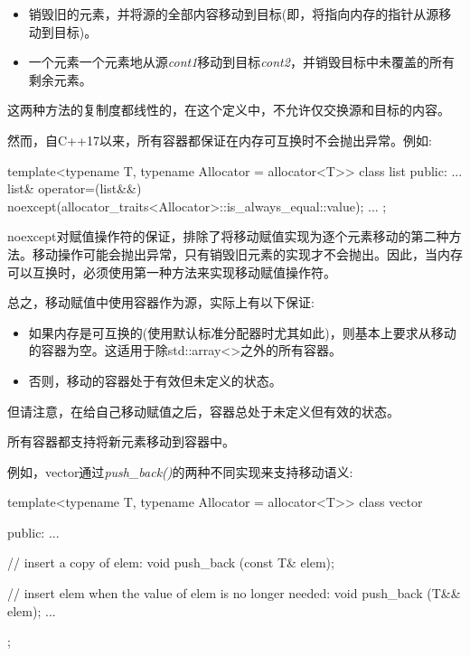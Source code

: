\begin{itemize}
  \item 销毁旧的元素，并将源的全部内容移动到目标(即，将指向内存的指针从源移动到目标)。
  \item 一个元素一个元素地从源\textit{cont1}移动到目标\textit{cont2}，并销毁目标中未覆盖的所有剩余元素。
\end{itemize}

这两种方法的复制度都线性的，在这个定义中，不允许仅交换源和目标的内容。\par

然而，自C++17以来，所有容器都保证在内存可互换时不会抛出异常。例如:\par

\begin{codebox}[cpp]
template<typename T, typename Allocator = allocator<T>>
class list {
public:
  ...
  list& operator=(list&&)
  noexcept(allocator_traits<Allocator>::is_always_equal::value);
  ...
};
\end{codebox}

noexcept对赋值操作符的保证，排除了将移动赋值实现为逐个元素移动的第二种方法。移动操作可能会抛出异常，只有销毁旧元素的实现才不会抛出。因此，当内存可以互换时，必须使用第一种方法来实现移动赋值操作符。\par

总之，移动赋值中使用容器作为源，实际上有以下保证:\par

\begin{itemize}
  \item 如果内存是可互换的(使用默认标准分配器时尤其如此)，则基本上要求从移动的容器为空。这适用于除std::array<>之外的所有容器。
  \item 否则，移动的容器处于有效但未定义的状态。
\end{itemize}

但请注意，在给自己移动赋值之后，容器总处于未定义但有效的状态。\par


所有容器都支持将新元素移动到容器中。\par


例如，vector通过\textit{push\_\allowbreak{}back(\allowbreak{})\allowbreak{}}的两种不同实现来支持移动语义:\par

\begin{codebox}[cpp]
template<typename T, typename Allocator = allocator<T>>
class vector {
public:
  ...

  // insert a copy of elem:
  void push_back (const T& elem);

  // insert elem when the value of elem is no longer needed:
  void push_back (T&& elem);
  ...
};
\end{codebox}

